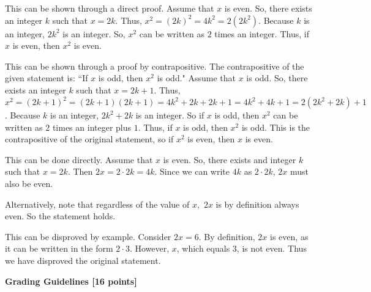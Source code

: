 \documentclass[12pt]{exam}
\begin{document}
\begin{solution}
\begin{qparts}
    \item This can be shown through a direct proof. Assume that $x$ is even. So, there exists an integer $k$ such that $x = 2k$. Thus, $x^2 = (2k)^2 = 4k^2 = 2(2k^2)$. Because $k$ is an integer, $2k^2$ is an integer. So, $x^2$ can be written as $2$ times an integer. Thus, if $x$ is even, then $x^2$ is even.
    
    \item This can be shown through a proof by contrapositive. The contrapositive of the given statement is: ``If $x$ is odd, then $x^2$ is odd." Assume that $x$ is odd. So, there exists an integer $k$ such that $x = 2k + 1$. Thus, $x^2 = (2k + 1)^2 = (2k + 1)(2k + 1) = 4k^2 + 2k + 2k + 1 = 4k^2 + 4k + 1 = 2(2k^2 + 2k) + 1$. Because $k$ is an integer, $2k^2 + 2k$ is an integer. So if $x$ is odd, then $x^2$ can be written as $2$ times an integer plus $1$. Thus, if $x$ is odd, then $x^2$ is odd. This is the contrapositive of the original statement, so if $x^2$ is even, then $x$ is even.
    
    \item This can be done directly. Assume that $x$ is even. So, there exists and integer $k$ such that $x = 2k$. Then $2x = 2\cdot 2k = 4k$. Since we can write $4k$ as $2\cdot 2k$, $2x$ must also be even.

    Alternatively, note that regardless of the value of $x,$ $2x$ is by definition always even. So the statement holds.
    
    \item This can be disproved by example. Consider $2x = 6$. By definition, $2x$ is even, as it can be written in the form $2 \cdot 3$. However, $x$, which equals $3$, is not even. Thus we have disproved the original statement.
\end{qparts}

\smallskip
\textbf{Grading Guidelines [16 points]}


\end{solution}
\end{document}
